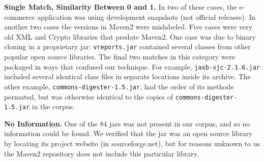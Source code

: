 \textbf{Single Match, Similarity Between 0 and 1.}
In two of these cases, the e-commerce application was using development snapshots (not official releases).
In another two cases the versions in Maven2 were mislabeled.
Five cases were very old XML and Crypto libraries that predate Maven2.
One case was due to binary cloning in a proprietary jar:
\texttt{vreports.jar} contained several classes from other popular open source libraries.
The final two matches in this category were packaged in ways that confused our technique.
For example, \texttt{jaxb-xjc-2.1.6.jar} included several identical class files in separate locations
inside its archive.
The other example, \texttt{commons-digester-1.5.jar}, had the order of its methods permuted,
but was otherwise identical to the copies of \texttt{commons-digester-1.5.jar} in the corpus.



\textbf{No Information.}
One of the $84$ jars was not present in our corpus, and so no information
could be found.  We verified that the jar was an open source library
by locating its project website (in sourceforge.net), but for reasons unknown
to us the Maven2 repository does not include this particular library.



